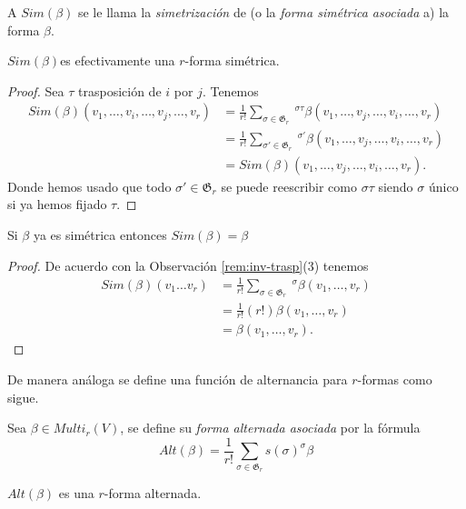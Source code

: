 \documentclass[\main/VD_completo.tex]{subfiles}
\begin{document}
A \(Sim(\beta)\) se le llama la \emph{simetrización} de (o la \emph{forma simétrica asociada} a) la forma \(\beta\). 

\begin{lemma}
\( Sim(\beta) \)es efectivamente una $r$-forma simétrica.
\end{lemma}

\begin{proof}
Sea \( \tau \) trasposición de \( i \) por \( j \). Tenemos
\begin{align*}
Sim(\beta)(v_1,\ldots, v_i,\ldots, v_j,\ldots, v_r)&=\frac{1}{r!}\sum_{\sigma\in \mathfrak{G}_r} \ ^{\sigma\tau}\beta (v_1,\ldots, v_j,\ldots, v_i,\ldots, v_r)\\
&=\frac{1}{r!}\sum_{\sigma'\in \mathfrak{G}_r} \ ^{\sigma'}\beta(v_1,\ldots, v_j,\ldots, v_i,\ldots, v_r)\\
&=Sim(\beta)(v_1,\ldots, v_j,\ldots, v_i,\ldots, v_r).
\end{align*}
Donde hemos usado que todo \( \sigma'\in \mathfrak{G}_r \) se puede reescribir como \( \sigma \tau \) siendo \( \sigma \) único si ya hemos fijado \( \tau \).
\end{proof}

\begin{lemma}
Si \( \beta \) ya es simétrica entonces \( Sim(\beta)=\beta \)
\end{lemma}

\begin{proof}
De acuerdo con la Observación \ref{rem:inv-trasp}(3) tenemos
\begin{align*}
Sim(\beta)(v_1\ldots v_r)&=\frac{1}{r!}\sum_{\sigma\in \mathfrak{G}_r} \  ^\sigma\beta(v_1,\ldots, v_r)\\
&=\frac{1}{r!}(r!)\beta(v_1,\ldots, v_r)\\
&=\beta(v_1,\ldots, v_r).
\end{align*}
\end{proof}


De manera análoga se define una función de alternancia para \(r\)-formas como sigue.
\begin{definition}
Sea \( \beta\in Multi_r(V) \), se define su \emph{forma alternada asociada} por la fórmula
\[
Alt(\beta)=\frac{1}{r!}\sum_{\sigma\in \mathfrak{G}_r} s(\sigma) ^\sigma\beta
\]
\end{definition}


\begin{lemma}
\( Alt(\beta) \) es una \(r\)-forma alternada.
\end{lemma}
\end{document}
